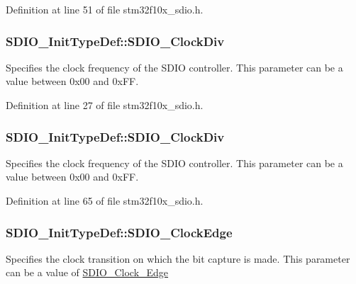 Definition at line 51 of file stm32f10x\+\_\+sdio.\+h.

\subsubsection[{\texorpdfstring{S\+D\+I\+O\+\_\+\+Clock\+Div}{SDIO_ClockDiv}}]{ S\+D\+I\+O\+\_\+\+Init\+Type\+Def\+::\+S\+D\+I\+O\+\_\+\+Clock\+Div}\hypertarget{struct_s_d_i_o___init_type_def_ae6fb06712b9e8debe6379fa43dae3cad}{}\label{struct_s_d_i_o___init_type_def_ae6fb06712b9e8debe6379fa43dae3cad}
Specifies the clock frequency of the S\+D\+IO controller. This parameter can be a value between 0x00 and 0x\+FF. 

Definition at line 27 of file stm32f10x\+\_\+sdio.\+h.

\subsubsection[{\texorpdfstring{S\+D\+I\+O\+\_\+\+Clock\+Div}{SDIO_ClockDiv}}]{ S\+D\+I\+O\+\_\+\+Init\+Type\+Def\+::\+S\+D\+I\+O\+\_\+\+Clock\+Div}\hypertarget{struct_s_d_i_o___init_type_def_a4166ee534e6cf8ac2c6a6a03bec45b06}{}\label{struct_s_d_i_o___init_type_def_a4166ee534e6cf8ac2c6a6a03bec45b06}
Specifies the clock frequency of the S\+D\+IO controller. This parameter can be a value between 0x00 and 0x\+FF. 

Definition at line 65 of file stm32f10x\+\_\+sdio.\+h.

\subsubsection[{\texorpdfstring{S\+D\+I\+O\+\_\+\+Clock\+Edge}{SDIO_ClockEdge}}]{ S\+D\+I\+O\+\_\+\+Init\+Type\+Def\+::\+S\+D\+I\+O\+\_\+\+Clock\+Edge}\hypertarget{struct_s_d_i_o___init_type_def_ae0a4b905228cff9700d91c9543541455}{}\label{struct_s_d_i_o___init_type_def_ae0a4b905228cff9700d91c9543541455}
Specifies the clock transition on which the bit capture is made. This parameter can be a value of \hyperlink{group___s_d_i_o___clock___edge}{S\+D\+I\+O\+\_\+\+Clock\+\_\+\+Edge} 

